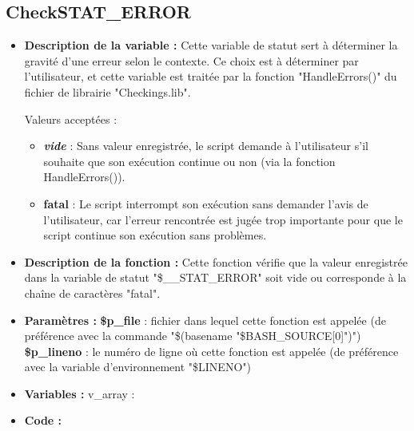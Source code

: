 \documentclass[a4paper,10pt]{article}
\begin{document}
\subsection{CheckSTAT\_ERROR}\color{white}
\begin{itemize}
    \item \textbf{Description de la variable :} Cette variable de statut sert à déterminer la gravité d'une erreur selon le contexte. Ce choix est à déterminer par l'utilisateur, et cette variable est traitée par la fonction "HandleErrors()" du fichier de librairie "Checkings.lib".
    
    Valeurs acceptées :
    \begin{itemize}
        \item \textbf{\textit{vide}} : Sans valeur enregistrée, le script demande à l'utilisateur s'il souhaite que son exécution continue ou non (via la fonction HandleErrors()).
        \item \textbf{fatal} : Le script interrompt son exécution sans demander l'avis de l'utilisateur, car l'erreur rencontrée est jugée trop importante pour que le script continue son exécution sans problèmes.
    \end{itemize}

    \item \textbf{Description de la fonction :} Cette fonction vérifie que la valeur enregistrée dans la variable de statut "\$\_\_STAT\_ERROR" soit vide ou corresponde à la chaîne de caractères "fatal".

    \item \textbf{Paramètres :}
    \color{orange}\textbf{\$p\_file}\color{white} : fichier dans lequel cette fonction est appelée (de préférence avec la commande "\$(\color{gray}basename \color{white}"\color{orange}\$BASH\_SOURCE[0]\color{white}")")
    \color{orange}\textbf{\$p\_lineno}\color{white} : le numéro de ligne où cette fonction est appelée (de préférence avec la variable d'environnement "\color{orange}\$LINENO\color{white}")

    \item \textbf{Variables :} v\_array :

    \item \textbf{Code :}
\end{itemize}

\color{green}
\end{document}
